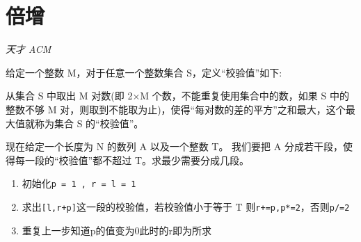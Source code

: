 \section{倍增}

\emph{天才 ACM}

给定一个整数 M，对于任意一个整数集合 S，定义“校验值”如下:

从集合 S 中取出 M 对数(即 2×M 个数，不能重复使用集合中的数，如果 S 中的整数不够 M 对，则取到不能取为止)，使得“每对数的差的平方”之和最大，这个最大值就称为集合 S 的“校验值”。

现在给定一个长度为 N 的数列 A 以及一个整数 T。 我们要把 A 分成若干段，使得每一段的“校验值”都不超过 T。求最少需要分成几段。
\begin{enumerate}
\item 初始化\verb|p = 1 , r = l = 1|
\item 求出\verb|[l,r+p]|这一段的校验值，若校验值小于等于 T 则\verb|r+=p,p*=2|，否则\verb|p/=2|
\item 重复上一步知道p的值变为0此时的r即为所求
\end{enumerate}

